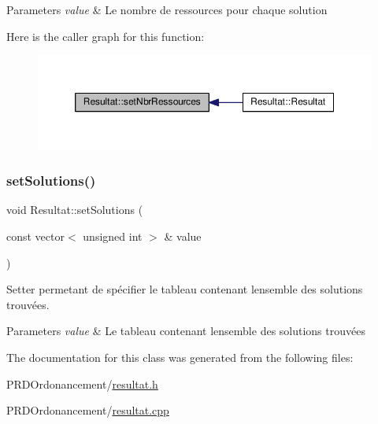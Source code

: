 \begin{DoxyParams}{Parameters}
{\em value} & Le nombre de ressources pour chaque solution \\
\hline
\end{DoxyParams}
Here is the caller graph for this function\+:\nopagebreak
\begin{figure}[H]
\begin{center}
\leavevmode
\includegraphics[width=350pt]{classResultat_a3e4e337fd9d39bf566a26873c9c4410c_icgraph}
\end{center}
\end{figure}
\mbox{\label{classResultat_a972135d1658be3aa3c72afbb5deaa6b7}} 
\subsubsection{\texorpdfstring{set\+Solutions()}{setSolutions()}}
{\footnotesize\ttfamily void Resultat\+::set\+Solutions (\begin{DoxyParamCaption}\item[{const vector$<$ unsigned int $>$ \&}]{value }\end{DoxyParamCaption})}



Setter permetant de spécifier le tableau contenant l\textquotesingle{}ensemble des solutions trouvées. 


\begin{DoxyParams}{Parameters}
{\em value} & Le tableau contenant l\textquotesingle{}ensemble des solutions trouvées \\
\hline
\end{DoxyParams}


The documentation for this class was generated from the following files\+:\begin{DoxyCompactItemize}
\item 
P\+R\+D\+Ordonancement/\hyperlink{resultat_8h}{resultat.\+h}\item 
P\+R\+D\+Ordonancement/\hyperlink{resultat_8cpp}{resultat.\+cpp}\end{DoxyCompactItemize}
